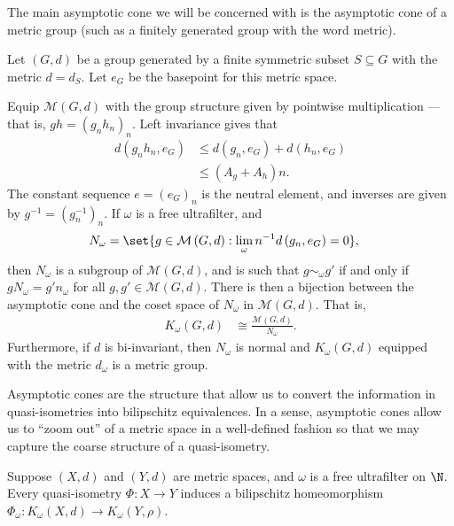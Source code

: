\documentclass[10pt]{mypackage}
\begin{document}
The main asymptotic cone we will be concerned with is the asymptotic cone of a metric group (such as a finitely generated group with the word metric).
\begin{example}
  Let $\left( G,d \right)$ be a group generated by a finite symmetric subset $S\subseteq G$ with the metric $d = d_S$. Let $e_G$ be the basepoint for this metric space.

  Equip $\mathcal{M}\left( G,d \right)$ with the group structure given by pointwise multiplication --- that is, $gh = \left( g_nh_n \right)_n$. Left invariance gives that
  \begin{align*}
    d\left( g_nh_n,e_G \right) &\leq d\left( g_n,e_G \right) + d\left( h_n,e_G \right)\\
                             &\leq \left( A_g + A_h \right)n.
  \end{align*}
  The constant sequence $e = \left( e_G \right)_{n}$ is the neutral element, and inverses are given by $g^{-1} = \left( g_n^{-1} \right)_{n}$. If $\omega$ is a free ultrafilter, and
  \begin{align*}
    N_{\omega} &= \set{g\in \mathcal{M}\left( G,d \right) : \lim_{\omega} n^{-1}d\left( g_n,e_G \right) = 0},
  \end{align*}
  then $N_{\omega}$ is a subgroup of $ \mathcal{M}\left( G,d \right) $, and is such that $g\sim_{\omega}g'$ if and only if $gN_{\omega} = g'n_{\omega}$ for all $g,g'\in \mathcal{M}\left( G,d \right)$. There is then a bijection between the asymptotic cone and the coset space of $N_{\omega}$ in $\mathcal{M}\left( G,d \right)$. That is,
  \begin{align*}
    K_{\omega}\left( G,d \right) &\cong \frac{\mathcal{M}\left( G,d \right)}{N_{\omega}}.
  \end{align*}
  Furthermore, if $d$ is bi-invariant, then $N_{\omega}$ is normal and $K_{\omega}\left( G,d \right)$ equipped with the metric $d_{\omega}$ is a metric group.
\end{example}
Asymptotic cones are the structure that allow us to convert the information in quasi-isometries into bilipschitz equivalences. In a sense, asymptotic cones allow us to ``zoom out'' of a metric space in a well-defined fashion so that we may capture the coarse structure of a quasi-isometry.
\begin{proposition}
  Suppose $\left( X,d \right)$ and $\left( Y,d \right)$ are metric spaces, and $\omega$ is a free ultrafilter on $ \N $. Every quasi-isometry $\Phi\colon X\rightarrow Y$ induces a bilipschitz homeomorphism $\Phi_{\omega}\colon K_{\omega}\left( X,d \right) \rightarrow K_{\omega}\left( Y,\rho \right)$.
\end{proposition}
\end{document}
